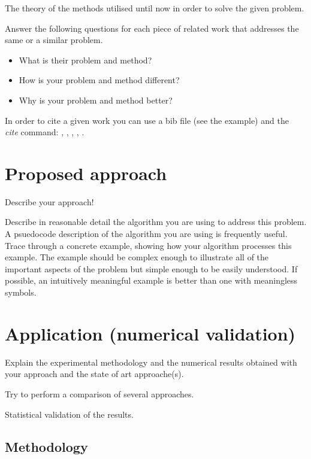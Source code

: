\documentclass[runningheads,a4paper,11pt]{report}
\begin{document}
The theory of the methods utilised until now in order to solve the given problem.

Answer the following questions for each piece of related work that addresses the same or a similar problem. 
\begin{itemize}
	\item What is their problem and method? 
	\item How is your problem and method different? 
	\item Why is your problem and method better?
\end{itemize}

In order to cite a given work you can use a bib file (see the example) and the $\ $ \textit{cite} command:
\cite{kennedy1}, \cite{Koh06}, \cite{Berlekamp82}, \cite{Storn95}, \cite{firefox}.



\chapter{Proposed approach}
\label{chapter:proposedApproach}

Describe your approach!

Describe in reasonable detail the algorithm you are using to address this problem. A psuedocode description of the algorithm you are using is frequently useful. Trace through a concrete example, showing how your algorithm processes this example. The example should be complex enough to illustrate all of the important aspects of the problem but simple enough to be easily understood. If possible, an intuitively meaningful example is better than one with meaningless symbols.


\chapter{Application (numerical validation)}
\label{chapter:application}


Explain the experimental methodology and the numerical results obtained with your approach and the state of art approache(s).

Try to perform a comparison of several approaches.

Statistical validation of the results.


\section{Methodology}
\label{section:methodology}
\end{document}
